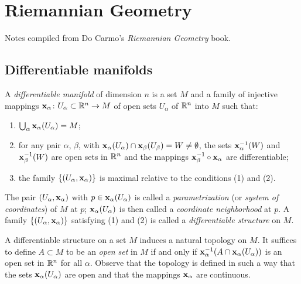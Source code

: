 \chapter{Riemannian Geometry}
Notes compiled from Do Carmo's \emph{Riemannian Geometry} book.
\section{Differentiable manifolds}
\begin{definition}
  A \emph{differentiable manifold} of dimension \(n\) is a set \(M\) and a
  family of injective mappings
  \(\mathbf{x}_\alpha\colon U_\alpha\subset\mathbb{R}^n\to M\) of open sets
  \(U_\alpha\) of \(\mathbb{R}^n\) into \(M\) such that:
  \begin{enumerate}[label=(\arabic*),noitemsep]
  \item \(\bigcup_\alpha\mathbf{x}_\alpha(U_\alpha)=M\);
  \item for any pair \(\alpha\), \(\beta\), with
    \(\mathbf{x}_\alpha(U_\alpha)\cap\mathbf{x}_\beta(U_\beta)=W\neq\emptyset\), the
    sets \(\mathbf{x}_\alpha^{-1}(W)\) and \(\mathbf{x}_\beta^{-1}(W)\) are open sets
    in \(\mathbb{R}^n\) and the mappings \(\mathbf{x}_\beta^{-1}\circ\mathbf{x}_\alpha\) are
    differentiable;
  \item the family \(\{(U_\alpha,\mathbf{x}_\alpha)\}\) is maximal relative to
    the conditions (1) and (2).
  \end{enumerate}
\end{definition}

The pair \((U_\alpha,\mathbf{x}_\alpha)\) with \(p\in\mathbf{x}_\alpha(U_\alpha)\) is
called a \emph{parametrization} (or \emph{system of coordinates}) of \(M\)
at \(p\); \(\mathbf{x}_\alpha(U_\alpha)\) is then called a \emph{coordinate
  neighborhood} at \(p\). A family \(\{(U_\alpha,\mathbf{x}_\alpha)\}\)
satisfying (1) and (2) is called a \emph{differentiable structure} on
\(M\).

\begin{remark}
  A differentiable structure on a set \(M\) induces a natural topology on
  \(M\). It suffices to define \(A\subset M\) to be an \emph{open set} in
  \(M\) if and only if \(\mathbf{x}_\alpha^{-1}(A\cap\mathbf{x}_\alpha(U_\alpha))\) is
  an open set in \(\mathbb{R}^n\) for all \(\alpha\). Observe that the topology
  is defined in such a way that the sets \(\mathbf{x}_\alpha(U_\alpha)\) are open
  and that the mappings \(\mathbf{x}_\alpha\) are continuous.
\end{remark}

